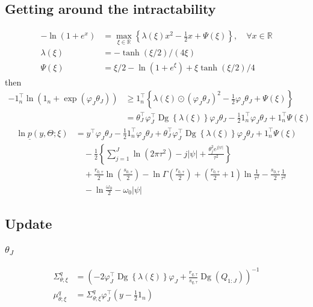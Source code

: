 \documentclass[11pt]{article}
\newcommand{\opn}{\operatorname}
\begin{document}
\subsection{Getting around the intractability}
\begin{align*}
  -\ln\left(1+e^{x}\right) &= \max_{\xi \in \mathbb{R}}\left\{\lambda\left(\xi\right)x^{2} - \frac{1}{2}x+\Psi\left(\xi\right) \right\}, \quad \forall x \in \mathbb{R}\\
  \lambda\left(\xi\right) &= -\tanh\left(\xi/2\right)/\left(4\xi\right)\\
  \Psi\left(\xi\right) &= \xi/2 - \ln\left(1+e^{\xi}\right) + \xi\tanh\left(\xi/2\right)/4
\end{align*}
then
\begin{align*}
  -1_{n}^{\top}\ln\left(1_{n}+\exp\left(\varphi_{J}\theta_{J}\right)\right) &\geq 1_{n}^{\top}\left\{\lambda\left(\xi\right) \odot \left(\varphi_{J}\theta_{J}\right)^{2} -\frac{1}{2}\varphi_{J}\theta_{J} + \Psi\left(\xi\right) \right\}\\
  &= \theta_{J}^{\top}\varphi_{J}^{\top}\opn{Dg}\left\{\lambda\left(\xi\right) \right\}\varphi_{J}\theta_{J} -\frac{1}{2}1_{n}^{\top}\varphi_{J}\theta_{J} + 1_{n}^{\top}\Psi\left(\xi\right)
\end{align*}
\begin{align*}
  \ln \underline{p}\left(y,\Theta;\xi\right) &= y^{\top}\varphi_{J}\theta_{J} -\frac{1}{2}1_{n}^{\top}\varphi_{J}\theta_{J} +\theta_{J}^{\top}\varphi_{J}^{\top}\opn{Dg}\left\{\lambda\left(\xi\right) \right\}\varphi_{J}\theta_{J} +1_{n}^{\top}\Psi\left(\xi\right) \\
    &\quad -\frac{1}{2}\left\{\sum_{j=1}^{J}\ln\left(2\pi\tau^{2}\right) - j\left|\psi\right| + \frac{\theta_{j}^{2}e^{j\left|\psi\right|}}{\tau^{2}}\right\}\\
    &\quad +\frac{r_{0,\tau}}{2}\ln\left(\frac{s_{0,\tau}}{2}\right) - \ln\Gamma\left(\frac{r_{0,\tau}}{2}\right) + \left(\frac{r_{0,\tau}}{2}+1\right)\ln\frac{1}{\tau^{2}} -\frac{s_{0,\tau}}{2}\frac{1}{\tau^{2}}\\
    &\quad -\ln\frac{\omega_{0}}{2} -\omega_{0}\left|\psi\right|
\end{align*}
\subsection{Update}
\subsubsection{$\theta_{J}$}
\begin{align*}
  \Sigma_{\theta;\xi}^{q} &= \left(-2\varphi_{J}^{\top}\opn{Dg}\left\{\lambda\left(\xi\right) \right\}\varphi_{J}+\frac{r_{q,\tau}}{s_{q,\tau}}\opn{Dg}\left(Q_{1:J}\right)\right)^{-1}\\
  \mu_{\theta;\xi}^{q} &= \Sigma_{\theta;\xi}^{q}\varphi_{J}^{\top}\left(y -\frac{1}{2}1_{n}\right)
\end{align*}
\end{document}
